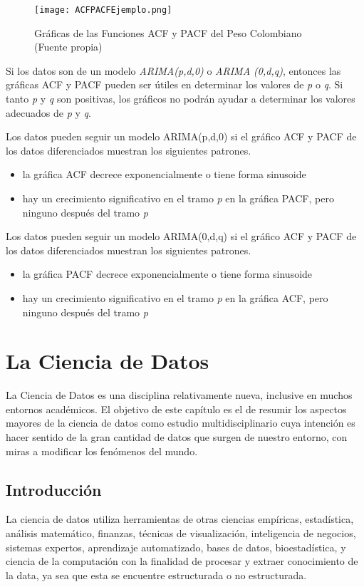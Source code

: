 \begin{spacing}{1.5}
\begin{figure}[h!]
    \centering
    \texttt{[image: ACFPACFEjemplo.png]}
    \caption{Gráficas de las Funciones ACF y PACF del Peso Colombiano (Fuente propia)}
\end{figure}

Si los datos son de un modelo \textit{ARIMA(p,d,0)} o \textit{ARIMA (0,d,q)}, entonces las gráficas ACF y PACF pueden ser útiles en determinar los valores de \emph{p} o \emph{q}. Si tanto \emph{p} y \emph{q} son positivas, los gráficos no podrán ayudar a determinar los valores adecuados de \emph{p} y \emph{q}. 

Los datos pueden seguir un modelo ARIMA(p,d,0) si el gráfico ACF y PACF de los datos diferenciados muestran los siguientes patrones. 
\begin{itemize}
	\item la gráfica ACF decrece exponencialmente o tiene forma sinusoide 
	\item hay un crecimiento significativo en el tramo \textit{p} en la gráfica PACF, pero ninguno después del tramo \textit{p}
\end{itemize}

Los datos pueden seguir un modelo ARIMA(0,d,q) si el gráfico ACF y PACF de los datos diferenciados muestran los siguientes patrones. 
\begin{itemize}
	\item la gráfica PACF decrece exponencialmente o tiene forma sinusoide 
	\item hay un crecimiento significativo en el tramo \textit{p} en la gráfica ACF, pero ninguno después del tramo \textit{p}
\end{itemize}

\section{La Ciencia de Datos}
La Ciencia de Datos es una disciplina relativamente nueva, inclusive en muchos entornos académicos. El objetivo de este capítulo es el de resumir los aspectos mayores de la ciencia de datos como estudio multidisciplinario cuya intención es hacer sentido de la gran cantidad de datos que surgen de nuestro entorno, con miras a modificar los fenómenos del mundo.

\subsection{Introducción}
La ciencia de datos \cite{zumelMount} utiliza herramientas de otras ciencias empíricas, estadística, análisis matemático, finanzas, técnicas de visualización, inteligencia de negocios, sistemas expertos, aprendizaje automatizado, bases de datos, bioestadística, y ciencia de la computación con la finalidad de procesar y extraer conocimiento de la data, ya sea que esta se encuentre estructurada o no estructurada. 


\end{spacing}
